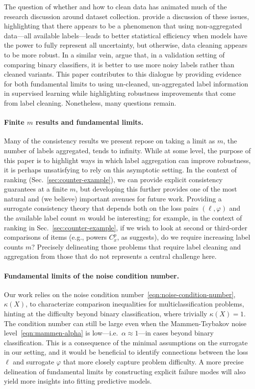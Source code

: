 \documentclass[11pt]{article}
\newcommand{\tloss}{\ell}  %
\newcommand{\sloss}{\varphi}  %
\begin{document}
The question of whether and how to clean data has
animated much of the research discussion around dataset collection.
%
\citet*{ChengAsDu22} provide a discussion of these issues, highlighting that
there appears to be a phenomenon that using non-aggregated data---all
available labels---leads to better statistical efficiency when models have
the power to fully represent all uncertainty, but otherwise, data cleaning
appears to be more robust.
%
In a similar vein, \citet{DornerHa24} argue that, in a validation setting of
comparing binary classifiers, it is better to use more noisy labels rather
than cleaned variants.
%
This paper contributes to this dialogue by providing evidence for both
fundamental limits to using un-cleaned, un-aggregated label information
in supervised learning while highlighting robustness improvements
that come from label cleaning.
%
Nonetheless, many questions remain.

\paragraph{Finite $m$ results and fundamental limits.}
Many of the consistency results we present repose on taking a limit
as $m$, the number of labels aggregated, tends to infinity.
%
While at some level, the purpose of this paper is to highlight ways
in which label aggregation can improve robustness, it is
perhaps unsatisfying to rely on this asymptotic setting.
%
In the context of ranking (Sec.~\ref{sec:counter-example}), we
can provide explicit consistency guarantees at a finite $m$,
but developing this further provides one of the most
natural and (we believe) important avenues for future work.
%
Providing a surrogate consistency theory that depends both on
the loss pairs $(\tloss, \sloss)$ and the available label
count $m$ would be interesting; for example,
in the context of ranking in Sec.~\ref{sec:counter-example},
if we wish to look at second or third-order comparisons
of items (e.g., powers $C_x^p$, as \citet{Keener93} suggests),
do we require increasing label counts $m$?
%
Precisely delineating those problems that require label cleaning and
aggregation from those that do not represents a central challenge here.

\paragraph{Fundamental limits of the noise condition number.}
Our work relies on the noise condition number~\eqref{eqn:noise-condition-number},
$\kappa(X)$, to characterize comparison inequalities for
multiclassification problems, hinting at the difficulty beyond
binary classification, where trivially $\kappa(X) = 1$.
%
The condition number can still be large even when the Mammen-Tsybakov noise
level~\eqref{eqn:mammen-alpha} is low---i.e.\ $\alpha \approx 1$---in cases
beyond binary classification.
%
This is a consequence of the
minimal assumptions on the surrogate in our setting, and it would
be beneficial to identify
connections between the loss $\tloss$ and surrogate $\sloss$
that more closely capture problem difficulty.
%
A more precise delineation of
fundamental limits by constructing explicit failure modes will
also yield more insights into fitting predictive models.
\end{document}
